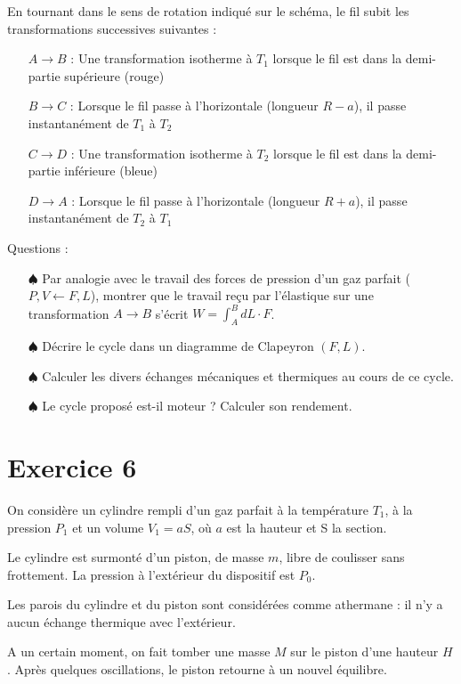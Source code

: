 \documentclass{report}
\begin{document}
En tournant dans le sens de rotation indiqué sur le schéma, le fil subit les transformations successives suivantes :
\begin{itemize}
\item[$A\rightarrow B$ :] Une transformation isotherme à $T_1$ lorsque le fil est dans la demi-partie supérieure (rouge)
\item[$B\rightarrow C$ :] Lorsque le fil passe à l'horizontale (longueur $R-a$), il passe instantanément de $T_1$ à $T_2$
\item[$C\rightarrow D$ :] Une transformation isotherme à $T_2$ lorsque le fil est dans la demi-partie inférieure (bleue)
\item[$D\rightarrow A$ :] Lorsque le fil passe à l'horizontale (longueur $R+a$), il passe instantanément de $T_2$ à $T_1$
\end{itemize}
Questions : 
\begin{itemize} 
\item[$\spadesuit$] Par analogie avec le travail des forces de pression d'un gaz parfait ($P, V\leftarrow F, L$), montrer que le travail reçu par l'élastique sur une transformation $A\rightarrow B$ s'écrit $W=\int_A^B dL\cdot F$.
\item[$\spadesuit$] Décrire le cycle dans un diagramme de Clapeyron $(F,L)$.
\item[$\spadesuit$] Calculer les divers échanges mécaniques et thermiques au cours de ce cycle.
\item[$\spadesuit$] Le cycle proposé est-il moteur ? Calculer son rendement.
\end{itemize}

\newpage

\section*{Exercice 6}

On considère un cylindre rempli d'un gaz parfait à la température $T_1$, à la pression $P_1$ et un volume $V_1=aS$, où $a$ est la hauteur et S la section.

Le cylindre est surmonté d'un piston, de masse $m$, libre de coulisser sans frottement. La pression à l'extérieur du dispositif est $P_0$.

Les parois du cylindre et du piston sont considérées comme athermane : il n'y a aucun échange thermique avec l'extérieur.

A un certain moment, on fait tomber une masse $M$ sur le piston d'une hauteur $H$. Après quelques oscillations, le piston retourne à un nouvel équilibre.
\end{document}
